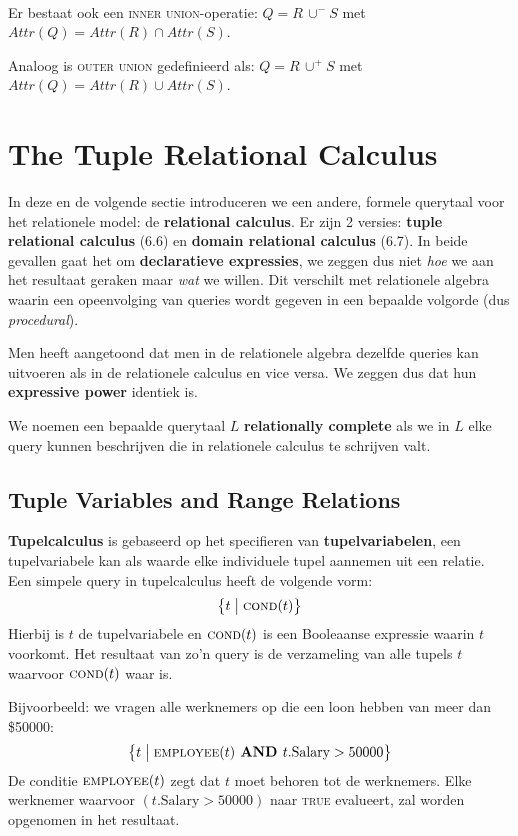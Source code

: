 ~

\noindent Er bestaat ook een \textsc{inner union}-operatie: $Q = R \,\cup^- S$ met $\textit{Attr}(Q) = \textit{Attr}(R) \cap \textit{Attr}(S)$.

Analoog is \textsc{outer union} gedefinieerd als: $Q = R \,\cup^+ S$ met $\textit{Attr}(Q) = \textit{Attr}(R) \cup \textit{Attr}(S)$.


\setcounter{section}{5}
\section{The Tuple Relational Calculus}
In deze en de volgende sectie introduceren we een andere, formele querytaal voor het relationele model: de \textbf{relational calculus}. Er zijn 2 versies: \textbf{tuple relational calculus} (6.6) en \textbf{domain relational calculus} (6.7). In beide gevallen gaat het om \textbf{declaratieve expressies}, we zeggen dus niet \textit{hoe} we aan het resultaat geraken maar \textit{wat} we willen. Dit verschilt met relationele algebra waarin een opeenvolging van queries wordt gegeven in een bepaalde volgorde (dus \textit{procedural}).

Men heeft aangetoond dat men in de relationele algebra dezelfde queries kan uitvoeren als in de relationele calculus en vice versa. We zeggen dus dat hun \textbf{expressive power} identiek is.

We noemen een bepaalde querytaal $L$ \textbf{relationally complete} als we in $L$ elke query kunnen beschrijven die in relationele calculus te schrijven valt.


\subsection{Tuple Variables and Range Relations}
\textbf{Tupelcalculus} is gebaseerd op het specifieren van \textbf{tupelvariabelen}, een tupelvariabele kan als waarde elke individuele tupel aannemen uit een relatie. Een simpele query in tupelcalculus heeft de volgende vorm:
\vspace{-2mm}
\[ \big\{ t \bigm| \textsc{cond}(t) \big\} \]
Hierbij is $t$ de tupelvariabele en $\textsc{cond}(t)$ is een Booleaanse expressie waarin $t$ voorkomt. Het resultaat van zo'n query is de verzameling van alle tupels $t$ waarvoor $\textsc{cond}(t)$ waar is.

Bijvoorbeeld: we vragen alle werknemers op die een loon hebben van meer dan \$50000:
\vspace{-2mm}
\[ \big\{ t \bigm| \textsc{employee}(t) \textbf{ AND } t.\text{Salary} > 50000 \big\} \]
De conditie $\textsc{employee}(t)$ zegt dat $t$ moet behoren tot de werknemers. Elke werknemer waarvoor $(t.\text{Salary} > 50000)$ naar \textsc{true} evalueert, zal worden opgenomen in het resultaat.

